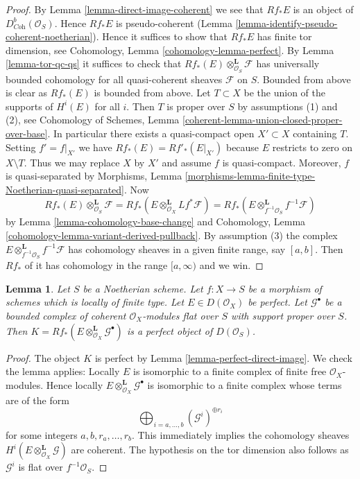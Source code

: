 \documentclass{stacks-project}
\theoremstyle{plain}
\newtheorem{lemma}[subsection]{Lemma}
\theoremstyle{definition}
\theoremstyle{remark}
\numberwithin{equation}{subsection}
\begin{document}
\begin{proof}
By Lemma \ref{lemma-direct-image-coherent} we see that $Rf_*E$ is an object of
$D^b_{\textit{Coh}}(\mathcal{O}_S)$. Hence $Rf_*E$ is pseudo-coherent
(Lemma \ref{lemma-identify-pseudo-coherent-noetherian}).
Hence it suffices to show that $Rf_*E$ has finite tor dimension, see
Cohomology, Lemma \ref{cohomology-lemma-perfect}.
By Lemma \ref{lemma-tor-qc-qs} it suffices to check that
$Rf_*(E) \otimes_{\mathcal{O}_S}^\mathbf{L} \mathcal{F}$
has universally bounded cohomology for all quasi-coherent
sheaves $\mathcal{F}$ on $S$. Bounded from above is clear as $Rf_*(E)$
is bounded from above. Let $T \subset X$ be the union of the supports
of $H^i(E)$ for all $i$. Then $T$ is proper over $S$ by assumptions
(1) and (2), see Cohomology of Schemes, Lemma
\ref{coherent-lemma-union-closed-proper-over-base}.
In particular there exists a quasi-compact open
$X' \subset X$ containing $T$. Setting $f' = f|_{X'}$ we have
$Rf_*(E) = Rf'_*(E|_{X'})$ because $E$ restricts to zero on $X \setminus T$.
Thus we may replace $X$ by $X'$ and assume $f$ is quasi-compact.
Moreover, $f$ is quasi-separated by Morphisms, Lemma
\ref{morphisms-lemma-finite-type-Noetherian-quasi-separated}. Now
$$
Rf_*(E) \otimes_{\mathcal{O}_S}^\mathbf{L} \mathcal{F} =
Rf_*\left(E \otimes_{\mathcal{O}_X}^\mathbf{L} Lf^*\mathcal{F}\right) =
Rf_*\left(E \otimes_{f^{-1}\mathcal{O}_S}^\mathbf{L} f^{-1}\mathcal{F}\right)
$$
by
Lemma \ref{lemma-cohomology-base-change}
and
Cohomology, Lemma \ref{cohomology-lemma-variant-derived-pullback}.
By assumption (3) the complex
$E \otimes_{f^{-1}\mathcal{O}_S}^\mathbf{L} f^{-1}\mathcal{F}$
has cohomology sheaves in a
given finite range, say $[a, b]$. Then $Rf_*$ of it
has cohomology in the range $[a, \infty)$ and we win.
\end{proof}

\begin{lemma}
\label{lemma-tensor-perfect}
Let $S$ be a Noetherian scheme. Let $f : X \to S$ be a morphism of schemes
which is locally of finite type. Let $E \in D(\mathcal{O}_X)$ be perfect.
Let $\mathcal{G}^\bullet$ be a bounded complex of coherent
$\mathcal{O}_X$-modules flat over $S$ with support proper over $S$.
Then $K = Rf_*(E \otimes_{\mathcal{O}_X}^\mathbf{L} \mathcal{G}^\bullet)$
is a perfect object of $D(\mathcal{O}_S)$.
\end{lemma}

\begin{proof}
The object $K$ is perfect by Lemma \ref{lemma-perfect-direct-image}.
We check the lemma applies: Locally $E$ is isomorphic to a finite complex
of finite free $\mathcal{O}_X$-modules. Hence locally
$E \otimes^\mathbf{L}_{\mathcal{O}_X} \mathcal{G}^\bullet$ is isomorphic
to a finite complex whose terms are of the form
$$
\bigoplus\nolimits_{i = a, \ldots, b} (\mathcal{G}^i)^{\oplus r_i}
$$
for some integers $a, b, r_a, \ldots, r_b$. This immediately implies the
cohomology sheaves $H^i(E \otimes^\mathbf{L}_{\mathcal{O}_X} \mathcal{G})$
are coherent. The hypothesis on the tor dimension also follows as
$\mathcal{G}^i$ is flat over $f^{-1}\mathcal{O}_S$.
\end{proof}
\end{document}
